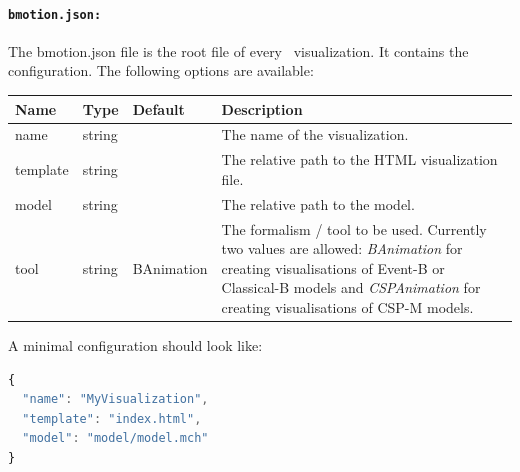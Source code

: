 
\paragraph{\texttt{bmotion.json:}}
The bmotion.json file is the root file of every \bms\ visualization.
It contains the configuration.
The following options are available:

\begin{tabular}{ l l l p{7cm} }
  \textbf{Name} & \textbf{Type} & \textbf{Default} & \textbf{Description} \\
  \hline\noalign{\medskip}
  name & string & & The name of the visualization.\\
  \hline\noalign{\medskip}
  template & string & & The relative path to the HTML visualization file. \\
  \hline\noalign{\medskip}
  model & string & & The relative path to the model. \\
  \hline\noalign{\medskip}
  tool & string & BAnimation & The formalism / tool to be used. Currently two values are allowed: \textit{BAnimation} for creating visualisations of Event-B or Classical-B models and \textit{CSPAnimation} for creating visualisations of CSP-M models.\\
\end{tabular}

\vspace*{0.5cm}

A minimal configuration should look like:

\begin{lstlisting}[language=JavaScript]
{
  "name": "MyVisualization",
  "template": "index.html",
  "model": "model/model.mch"
}
\end{lstlisting}



